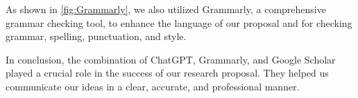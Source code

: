 \documentclass{epsrc}
\begin{document}
As shown in \ref{fig:Grammarly}, we also utilized Grammarly, a comprehensive grammar checking tool, to enhance the language of our proposal and for checking grammar, spelling, punctuation, and style.
\vspace{5pt}

In conclusion, the combination of ChatGPT, Grammarly, and Google Scholar played a crucial role in the success of our research proposal. They helped us communicate our ideas in a clear, accurate, and professional manner.
\vspace{5pt}



\end{document}
